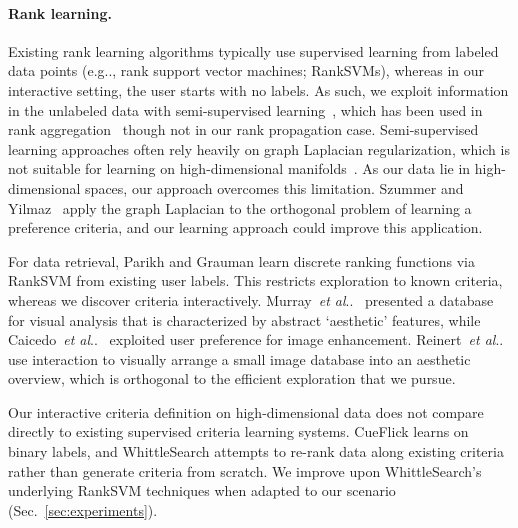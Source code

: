 \documentclass{article}
\makeatletter
\DeclareRobustCommand\onedot{\futurelet\@let@token\@onedot}
\def\@onedot{\ifx\@let@token.\else.\null\fi\xspace}
\def\eg{{e.g}\onedot} \def\Eg{{E.g}\onedot}
\def\etal{\emph{et al}\onedot}
\makeatother
\begin{document}
\paragraph{Rank learning.}
Existing rank learning algorithms typically use supervised learning from labeled data points (\eg, rank support vector machines; RankSVMs), whereas in our interactive setting, the user starts with no labels. As such, we exploit information in the unlabeled data with semi-supervised learning~\cite{ChaSchZie06,Zhu08}, which has been used in rank aggregation~\cite{CheWanSon08} though not in our rank propagation case. Semi-supervised learning approaches often rely heavily on graph Laplacian regularization, which is not suitable for learning on high-dimensional manifolds~\cite{NadSreZho09,KimTompkin2015}. As our data lie in high-dimensional spaces, our approach overcomes this limitation. Szummer and Yilmaz~\cite{SzuYil2011} apply the graph Laplacian to the orthogonal problem of learning a preference criteria, and our learning approach could improve this application.

For data retrieval, Parikh and Grauman \cite{ParGra11} learn discrete ranking functions via RankSVM from existing user labels. This restricts exploration to known criteria, whereas we discover criteria interactively. Murray~\etal~\cite{MurMarPer12} presented a database for visual analysis that is characterized by abstract `aesthetic' features, while Caicedo~\etal~\cite{CaiKapKan11} exploited user preference for image enhancement. Reinert~\etal~\cite{ReiRitSei13} use interaction to visually arrange a small image database into an aesthetic overview, which is orthogonal to the efficient exploration that we pursue.

Our interactive criteria definition on high-dimensional data does not compare directly to existing supervised criteria learning systems. CueFlick \cite{FogTanKap08,AmeFogKap11} learns on binary labels, and WhittleSearch \cite{ParGra11} attempts to re-rank data along existing criteria rather than generate criteria from scratch. We improve upon WhittleSearch's underlying RankSVM techniques when adapted to our scenario (Sec.~\ref{sec:experiments}).
\end{document}
